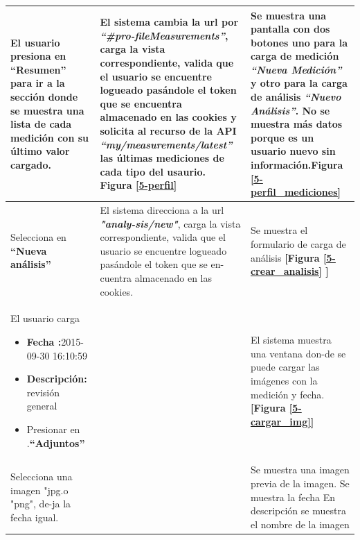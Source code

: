 \documentclass[a4paper,12pt]{article}
\begin{document}
\begin{longtable}{|p{5cm}|p{5cm}|p{5cm}|}
El usuario presiona en \textbf{``Resumen'' } para ir a la sección donde se muestra una lista de cada medición con su último valor cargado.

& El sistema cambia la url por \textit{\textbf{``\#pro-fileMeasurements''}}, carga la vista correspondiente, valida que el usuario se encuentre logueado pasándole el token que se encuentra almacenado en las cookies y solicita al recurso de la API \textit{\textbf{``my/measurements/latest'' }}las últimas mediciones de cada tipo del usaurio. \textbf{Figura \ref{5-perfil}}

& Se muestra una pantalla con dos botones uno para la carga de medición
\textit{\textbf{``Nueva Medición'' }}y otro para la carga de análisis \textit{\textbf{``Nuevo Análisis''}}. No se muestra más datos porque es un usuario nuevo sin información.\textbf{Figura \ref{5-perfil_mediciones}}
\\ \hline



Selecciona en \textbf{``Nueva análisis'' }
& El sistema direcciona a la url \textit{\textbf{"analy-sis/new"}}, carga la vista correspondiente, valida que el usuario se encuentre logueado pasándole el token que se en-
cuentra almacenado en las cookies.

& Se muestra el formulario de carga de análisis \textbf{[Figura \ref{5-crear_analisis} ]}
\\ \hline



El usuario carga

\begin{itemize}
	\item \textbf{Fecha :}2015-09-30 16:10:59
	\item \textbf{Descripción: }revisión general
	\item Presionar en .\textbf{``Adjuntos''}

\end{itemize}

&
& El sistema muestra una ventana don-de se puede cargar las imágenes con la medición y fecha.\textbf{ [Figura  \ref{5-cargar_img}]}

\\ \hline



Selecciona una imagen "jpg.o "png", de-ja la fecha igual. 
&
& Se muestra una imagen previa de la imagen. Se muestra la fecha En descripción se muestra el nombre de la imagen
\\ \hline
 

\end{longtable}
\end{document}

